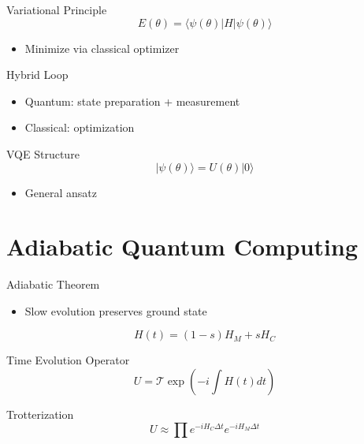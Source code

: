 \documentclass{beamer}
\begin{document}
\begin{frame}{Variational Principle}
\[
E(\theta) = \langle \psi(\theta)|H|\psi(\theta)\rangle
\]
\begin{itemize}
\item Minimize via classical optimizer
\end{itemize}
\end{frame}


\begin{frame}{Hybrid Loop}
\begin{itemize}
\item Quantum: state preparation + measurement
\item Classical: optimization
\end{itemize}
\end{frame}


\begin{frame}{VQE Structure}
\[
|\psi(\theta)\rangle = U(\theta)|0\rangle
\]
\begin{itemize}
\item General ansatz
\end{itemize}
\end{frame}

\section{Adiabatic Quantum Computing}

\begin{frame}{Adiabatic Theorem}
\begin{itemize}
\item Slow evolution preserves ground state
\end{itemize}
\[
H(t) = (1-s)H_M + sH_C
\]
\end{frame}


\begin{frame}{Time Evolution Operator}
\[
U = \mathcal{T}\exp\left(-i\int H(t)dt\right)
\]
\end{frame}


\begin{frame}{Trotterization}
\[
U \approx \prod e^{-iH_C\Delta t}e^{-iH_M\Delta t}
\]
\end{frame}
\end{document}
